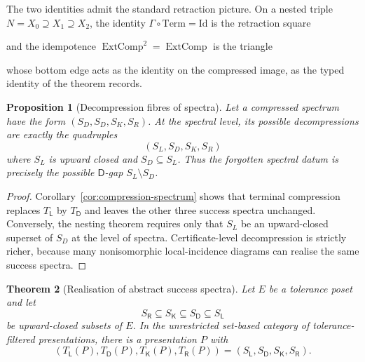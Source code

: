 \documentclass[11pt]{article}
\theoremstyle{plain}
\newtheorem{theorem}{Theorem}[section]
\newtheorem{proposition}[theorem]{Proposition}
\theoremstyle{definition}
\theoremstyle{remark}
\begin{document}
The two identities admit the standard retraction picture.  On a nested
triple $N=X_0\supseteq X_1\supseteq X_2$, the identity
$\Gamma\circ\mathrm{Term}=\mathrm{Id}$ is the retraction square
\begin{center}
\end{center}
and the idempotence $\operatorname{ExtComp}^2=\operatorname{ExtComp}$ is
the triangle
\begin{center}
\end{center}
whose bottom edge acts as the identity on the compressed image, as the
typed identity of the theorem records.

\begin{proposition}[Decompression fibres of spectra]
\label{prop:decompression-fibres-monograph}
Let a compressed spectrum have the form
$(S_D,S_D,S_K,S_R)$. At the spectral level, its possible decompressions are
exactly the quadruples
\[
(S_L,S_D,S_K,S_R)
\]
where $S_L$ is upward closed and $S_D\subseteq S_L$. Thus the forgotten spectral
datum is precisely the possible $\mathsf D$-gap $S_L\setminus S_D$.
\end{proposition}

\begin{proof}
Corollary~\ref{cor:compression-spectrum} shows that terminal compression replaces
$T_{\mathsf L}$ by $T_{\mathsf D}$ and leaves the other three success spectra
unchanged. Conversely, the nesting theorem requires only that $S_L$ be an
upward-closed superset of $S_D$ at the level of spectra. Certificate-level
decompression is strictly richer, because many nonisomorphic local-incidence
diagrams can realise the same success spectra.
\end{proof}

\begin{theorem}[Realisation of abstract success spectra]
\label{thm:abstract-spectrum-realisation}
Let $E$ be a tolerance poset and let
\[
S_{\mathsf R}\subseteq S_{\mathsf K}\subseteq S_{\mathsf D}\subseteq S_{\mathsf L}
\]
be upward-closed subsets of $E$. In the unrestricted set-based category of
tolerance-filtered presentations, there is a presentation $P$ with
\[
(T_{\mathsf L}(P),T_{\mathsf D}(P),T_{\mathsf K}(P),T_{\mathsf R}(P))
=(S_{\mathsf L},S_{\mathsf D},S_{\mathsf K},S_{\mathsf R}).
\]
\end{theorem}
\end{document}
